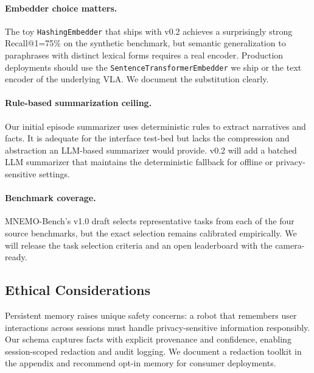 \paragraph{Embedder choice matters.}
The toy \texttt{HashingEmbedder} that ships with v0.2 achieves a
surprisingly strong Recall@1=75\% on the synthetic benchmark, but
semantic generalization to paraphrases with distinct lexical forms
requires a real encoder. Production deployments should use the
\texttt{SentenceTransformerEmbedder} we ship or the text encoder of
the underlying VLA. We document the substitution clearly.

\paragraph{Rule-based summarization ceiling.}
Our initial episode summarizer uses deterministic rules to extract
narratives and facts. It is adequate for the interface test-bed but
lacks the compression and abstraction an LLM-based summarizer would
provide. v0.2 will add a batched LLM summarizer that maintains the
deterministic fallback for offline or privacy-sensitive settings.

\paragraph{Benchmark coverage.}
MNEMO-Bench's v1.0 draft selects representative tasks from each of
the four source benchmarks, but the exact selection remains
calibrated empirically. We will release the task selection criteria
and an open leaderboard with the camera-ready.

\subsection{Ethical Considerations}

Persistent memory raises unique safety concerns: a robot that
remembers user interactions across sessions must handle
privacy-sensitive information responsibly. Our schema captures
facts with explicit provenance and confidence, enabling
session-scoped redaction and audit logging. We document a
redaction toolkit in the appendix and recommend opt-in memory for
consumer deployments.
